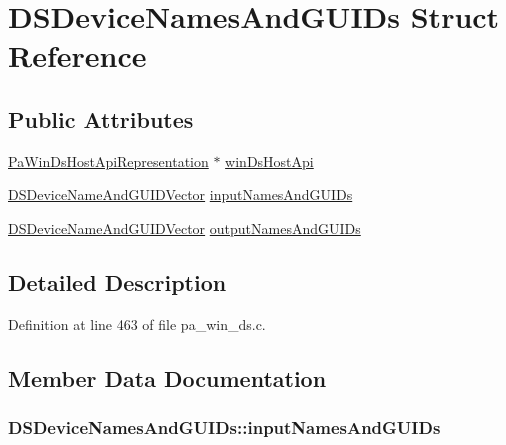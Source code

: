 \hypertarget{struct_d_s_device_names_and_g_u_i_ds}{}\section{D\+S\+Device\+Names\+And\+G\+U\+I\+Ds Struct Reference}
\label{struct_d_s_device_names_and_g_u_i_ds}
\subsection*{Public Attributes}
\begin{DoxyCompactItemize}
\item 
\hyperlink{struct_pa_win_ds_host_api_representation}{Pa\+Win\+Ds\+Host\+Api\+Representation} $\ast$ \hyperlink{struct_d_s_device_names_and_g_u_i_ds_ab6d01e9e0b3b7699b23d9ac36113ab37}{win\+Ds\+Host\+Api}
\item 
\hyperlink{struct_d_s_device_name_and_g_u_i_d_vector}{D\+S\+Device\+Name\+And\+G\+U\+I\+D\+Vector} \hyperlink{struct_d_s_device_names_and_g_u_i_ds_afdb0425969e8b2a3ba8c73337b481a90}{input\+Names\+And\+G\+U\+I\+Ds}
\item 
\hyperlink{struct_d_s_device_name_and_g_u_i_d_vector}{D\+S\+Device\+Name\+And\+G\+U\+I\+D\+Vector} \hyperlink{struct_d_s_device_names_and_g_u_i_ds_aa1c6709850286664c45e76a2f3e20326}{output\+Names\+And\+G\+U\+I\+Ds}
\end{DoxyCompactItemize}


\subsection{Detailed Description}


Definition at line 463 of file pa\+\_\+win\+\_\+ds.\+c.



\subsection{Member Data Documentation}
\subsubsection[{\texorpdfstring{input\+Names\+And\+G\+U\+I\+Ds}{inputNamesAndGUIDs}}]{ D\+S\+Device\+Names\+And\+G\+U\+I\+Ds\+::input\+Names\+And\+G\+U\+I\+Ds}\hypertarget{struct_d_s_device_names_and_g_u_i_ds_afdb0425969e8b2a3ba8c73337b481a90}{}\label{struct_d_s_device_names_and_g_u_i_ds_afdb0425969e8b2a3ba8c73337b481a90}


